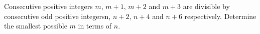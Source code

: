 Consecutive positive integers $m$, $m+1$, $m+2$ and $m+3$ are divisible by consecutive odd positive integersn, $n+2$, $n+4$ and $n+6$ respectively. Determine the smallest possible $m$ in terms of $n$.